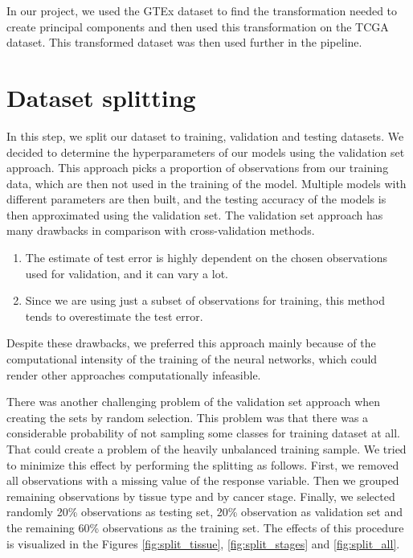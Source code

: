 In our project, we used the GTEx dataset to find the transformation needed to create principal components and then used this transformation on the TCGA dataset.
This transformed dataset was then used further in the pipeline.

\newpage
\section{Dataset splitting}
In this step, we split our dataset to training, validation and testing datasets.
We decided to determine the hyperparameters of our models using the validation set approach.
This approach picks a proportion of observations from our training data, which are then not used in the training of the model.
Multiple models with different parameters are then built, and the testing accuracy of the models is then approximated using the validation set.
The validation set approach has many drawbacks in comparison with cross-validation methods.
\begin{enumerate}
    \item The estimate of test error is highly dependent on the chosen observations used for validation, and it can vary a lot.
    \item Since we are using just a subset of observations for training, this method tends to overestimate the test error.
\end{enumerate}
Despite these drawbacks, we preferred this approach mainly because of the computational intensity of the training of the neural networks, which could render other approaches computationally infeasible. 

There was another challenging problem of the validation set approach when creating the sets by random selection.
This problem was that there was a considerable probability of not sampling some classes for training dataset at all.
That could create a problem of the heavily unbalanced training sample.
We tried to minimize this effect by performing the splitting as follows.
First, we removed all observations with a missing value of the response variable.
Then we grouped remaining observations by tissue type and by cancer stage.
Finally, we selected randomly 20\% observations as testing set, 20\% observation as validation set and the remaining 60\% observations as the training set.
The effects of this procedure is visualized in the Figures \ref{fig:split_tissue}, \ref{fig:split_stages} and \ref{fig:split_all}. 

